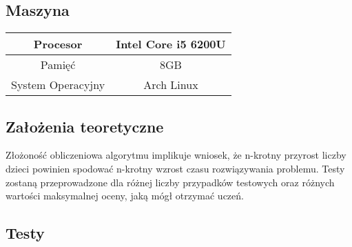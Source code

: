 \documentclass{article}
\begin{document}
	\subsection{Maszyna}
	\begin{center}
		\begin{longtable}{c c}
			\toprule
			Procesor & Intel Core i5 6200U \\
			\midrule
			Pamięć & 8GB \\
			\midrule
			System Operacyjny & Arch Linux\\
			\bottomrule
		\end{longtable}

	\subsection{Założenia teoretyczne}
	Złożoność obliczeniowa algorytmu implikuje wniosek, że n-krotny przyrost liczby dzieci powinien spodować n-krotny wzrost czasu rozwiązywania problemu. Testy zostaną przeprowadzone dla różnej liczby przypadków testowych oraz różnych wartości maksymalnej oceny, jaką mógł otrzymać uczeń.

	\subsection{Testy}

	\end{center}
\end{document}
